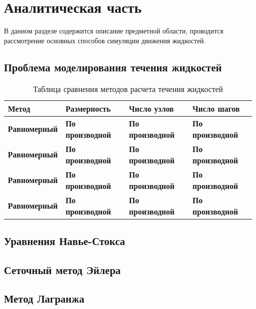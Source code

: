 \section{Аналитическая часть}

В данном разделе содержится описание предметной области, проводится рассмотрение основных способов симуляции движения жидкостей.

\subsection{Проблема моделирования течения жидкостей}

\begin{table}[htb]
    \centering
    \caption{Таблица сравнения методов расчета течения жидкостей}
    \label{tab:methods}
    \begin{tabular}{|l|l|l|l|}
        \hline
        \textbf{Метод} & \textbf{Размерность} & \textbf{Число узлов} & \textbf{Число шагов} \\
        \hline
        \textbf{Равномерный} & \textbf{По производной} & \textbf{По производной} & \textbf{По производной} \\
        \hline
        \textbf{Равномерный} & \textbf{По производной} & \textbf{По производной} & \textbf{По производной} \\
        \hline
        \textbf{Равномерный} & \textbf{По производной} & \textbf{По производной} & \textbf{По производной} \\
        \hline
        \textbf{Равномерный} & \textbf{По производной} & \textbf{По производной} & \textbf{По производной} \\
        \hline
    \end{tabular}
\end{table}

\subsection{Уравнения Навье-Стокса}

\subsection{Сеточный метод Эйлера}

\subsection{Метод Лагранжа}

\pagebreak